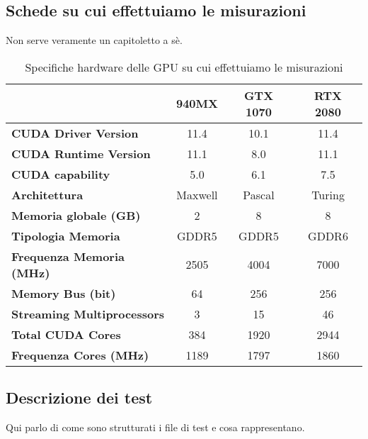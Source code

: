 \documentclass[a4paper]{article}
\begin{document}
	\subsection{Schede su cui effettuiamo le misurazioni}
	Non serve veramente un capitoletto a sè.
	\begin{table}[!ht]
		\centering
		\begin{tabular}{|l|c|c|c|}
			\hline
			  & \textbf{940MX} & \textbf{GTX 1070} & \textbf{RTX 2080} \\ \hline
			\textbf{CUDA Driver Version} & 11.4 & 10.1 & 11.4 \\ \hline
			\textbf{CUDA Runtime Version} & 11.1 & 8.0 & 11.1 \\ \hline
			\textbf{CUDA capability} & 5.0 & 6.1 & 7.5 \\ \hline
			\textbf{Architettura} & Maxwell & Pascal & Turing \\ \hline
			\textbf{Memoria globale (GB)} & 2 & 8 & 8 \\ \hline
			\textbf{Tipologia Memoria} & GDDR5 & GDDR5 & GDDR6 \\ \hline
			\textbf{Frequenza Memoria (MHz)} & 2505 & 4004 & 7000 \\ \hline
			\textbf{Memory Bus (bit)} & 64 & 256 & 256 \\ \hline
			\textbf{Streaming Multiprocessors} & 3 & 15 & 46 \\ \hline
			\textbf{Total CUDA Cores} & 384 & 1920 & 2944 \\ \hline
			\textbf{Frequenza Cores (MHz)} & 1189 & 1797 & 1860 \\ \hline
		\end{tabular}
		\label{tab:specs_gpus}
		\caption{Specifiche hardware delle GPU su cui effettuiamo le misurazioni}
	\end{table}

	\subsection{Descrizione dei test}
	Qui parlo di come sono strutturati i file di test e cosa rappresentano.
	
\end{document}
